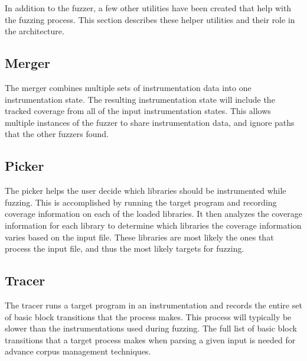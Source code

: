 In addition to the fuzzer, a few other utilities have been created that help
with the fuzzing process.  This section describes these helper utilities and
their role in the \killerbeez{} architecture.

\subsection{Merger}
The merger combines multiple sets of instrumentation data into one
instrumentation state.  The resulting instrumentation state will include the
tracked coverage from all of the input instrumentation states. This allows
multiple instances of the fuzzer to share instrumentation data, and ignore paths
that the other fuzzers found.

\subsection{Picker}
The picker helps the user decide which libraries should be instrumented while
fuzzing.  This is accomplished by running the target program and recording
coverage information on each of the loaded libraries. It then analyzes the
coverage information for each library to determine which libraries the
coverage information varies based on the input file.  These libraries are most
likely the ones that process the input file, and thus the most likely targets
for fuzzing.

\subsection{Tracer}
The tracer runs a target program in an instrumentation and records the entire
set of basic block transitions that the process makes.  This process will
typically be slower than the instrumentations used during fuzzing.  The full
list of basic block transitions that a target process makes when parsing a given
input is needed for advance corpus management techniques.
